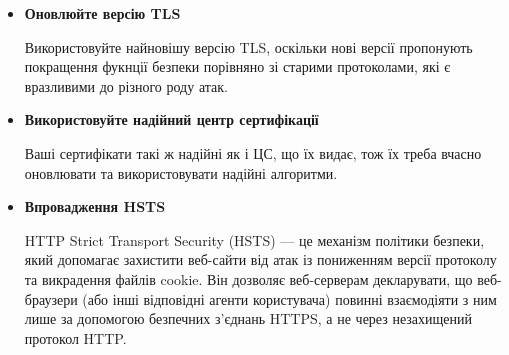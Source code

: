 \begin{itemize}
    \item \textbf{Оновлюйте версію TLS}


    Використовуйте найновішу версію TLS, оскільки нові версії пропонують покращення фукнції безпеки порівняно зі старими протоколами, які є вразливими до різного роду атак.
    
    \item \textbf{Використовуйте надійний центр сертифікації}


    Ваші сертифікати такі ж надійні як і ЦС, що їх видає, тож їх треба вчасно оновлювати та використовувати надійні алгоритми.
    
    \item \textbf{Впровадження HSTS}


    HTTP Strict Transport Security (HSTS) — це механізм політики безпеки, який допомагає захистити веб-сайти від атак із пониженням версії протоколу та викрадення файлів cookie. Він дозволяє веб-серверам декларувати, що веб-браузери (або інші відповідні агенти користувача) повинні взаємодіяти з ним лише за допомогою безпечних з’єднань HTTPS, а не через незахищений протокол HTTP.
    
\end{itemize}